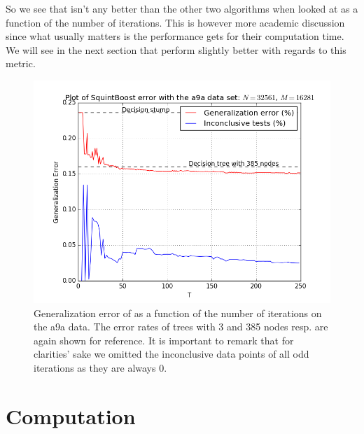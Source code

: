 \par So we see that \squintB isn't any better than the other two algorithms when looked at as a function of the number of iterations. This is however more academic discussion since what usually matters is the performance gets for their computation time. We will see in the next section that \squintB perform slightly better with regards to this metric.
\begin{figure}[!ht]
  \centering
      \includegraphics[width=\graphWidth]{generated/SQSVM.png}
  \caption{Generalization error of \squintB as a function of the number of iterations on the a9a data. The error rates of trees with 3 and 385 nodes resp. are again shown for reference. It is important to remark that for clarities' sake we omitted the inconclusive data points of all odd iterations as they are always 0.}
      \label{fig:SQSVM}
\end{figure}
\FloatBarrier

\newpage
\section{Computation}
\label{sec:timed}

